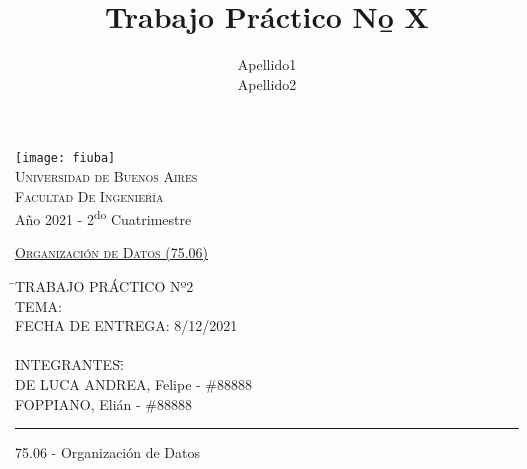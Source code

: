 \documentclass[12pt]{article}
\title{Trabajo Práctico N\b o X}
\author{Apellido1\\Apellido2}
\numberwithin{equation}{section}
\numberwithin{figure}{section}
\numberwithin{table}{section}
\begin{document}
	
	\pagestyle{fancy}
	\renewcommand{\sectionmark}[1]{\markboth{}{\thesection\ \ #1}}
	\lhead{}
	\chead{}
	\rhead{\rightmark}
	\lfoot{}
	\cfoot{}
	\rfoot{\thepage}
	
	\begin{titlepage}
		
		\thispagestyle{empty}
		
		\begin{center}
			\texttt{[image: fiuba]}\\
			\large{\textsc{Universidad de Buenos Aires}}\\
			\large{\textsc{Facultad De Ingeniería}}\\
			\small{Año 2021 - 2\textsuperscript{do} Cuatrimestre}
		\end{center}
		
		\vfill
		
		\begin{center}
			\Large{\underline{\textsc{Organización de Datos (75.06)}}}
		\end{center}
		
		\vfill
		
		\begin{tabbing}
			\hspace{2cm}\=\+TRABAJO PRÁCTICO Nº2\\
			TEMA: \\
			FECHA DE ENTREGA: 8/12/2021\\%
			\\
			INTEGRANTES:\hspace{-1cm}\=\+\hspace{1cm}\=\hspace{6cm}\=\\
			DE LUCA ANDREA, Felipe	\>\>- \#88888\\
			FOPPIANO, Elián	\>\>- \#88888\\
		\end{tabbing}
		
		\vfill
		
		\hrule
		\vspace{0.2cm}
		
		\noindent\small{75.06 - Organización de Datos}
		
	\end{titlepage}
	
	\setcounter{page}{1}
	
\end{document}

